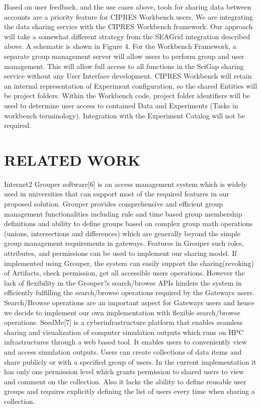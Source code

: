 \documentclass[sigconf]{acmart}
\begin{document}
Based on user feedback, and the use cases above, tools for sharing data between accounts  are a priority feature for CIPRES Workbench users. We are integrating the data sharing service with the CIPRES Workbench framework. Our approach will take a somewhat different strategy from the SEAGrid integration described above. A schematic is shown in Figure 4. For the Workbench Framework, a separate group management server will allow users to perform group and user management. This will allow full access to all functions in the SciGap sharing service without any User Interface development. CIPRES Workbench will retain an internal representation of Experiment configuration, so the shared Entities will be project folders.  Within the Workbench code, project folder identifiers will be used to determine user access to contained Data and Experiments (Tasks in workbench terminology).  Integration with the Experiment Catalog will not be required.

\section{RELATED WORK}

Internet2 Grouper software[6] is an access management system which is widely used in universities that can support most of the required features in our proposed solution. Grouper provides comprehensive and efficient group management functionalities including rule and time based group membership definitions and ability to define groups based on complex group math operations (unions, intersections and differences) which are generally beyond the simple group management requirements in gateways. Features in Grouper such roles, attributes, and permissions can be used to implement our sharing model. If implemented using Grouper, the system can easily support the sharing(revoking) of Artifacts, check permission, get all accessible users operations. However the lack of flexibility in the Grouper?s search/browse APIs hinders the system in efficiently fulfilling the search/browse operations required by the Gateways users. Search/Browse operations are an important aspect for Gateways users and hence we decide to implement our own implementation with flexible search/browse operations.
SeedMe[7] is a cyberinfrastructure platform that enables seamless sharing and visualization of computer simulation outputs which runs on HPC infrastructures through a web based tool. It enables users to conveniently view and access simulation outputs. Users can create collections of data items and share publicly or with a specified group of users. In the current implementation it has only one permission level which grants permission to shared users to view and comment on the collection. Also it lacks the ability to define reusable user groups and requires explicitly defining the list of users every time when sharing a collection.
\end{document}
